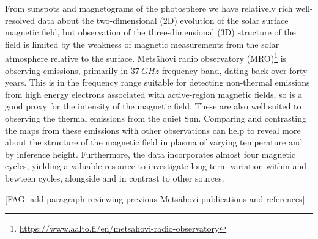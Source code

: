 \documentclass{aa}
\newcommand{\fag}[1]{\textcolor{midpurple}{[FAG: #1]}} %
\begin{document}
  From sunspots and magnetograms of the photosphere we have relatively rich
  well-resolved
  data about the 
  two-dimensional (2D) 
  evolution of the solar surface magnetic 
  field, but observation of the three-dimensional (3D)
  structure of the field is limited by the 
  weakness of magnetic measurements from the solar atmosphere relative to the
  surface.
  Mets\"ahovi radio observatory (MRO)\footnote{
  \href{https://www.aalto.fi/en/metsahovi-radio-observatory}{
        https://www.aalto.fi/en/metsahovi-radio-observatory}}
  is observing emissions, primarily in
  $\SI{37}{GHz}$ frequency band, dating back over forty years.
  This is in the frequency range suitable for detecting non-thermal emissions
  from high energy electrons associated with active-region magnetic fields, so
  is a good proxy for the intensity of the magnetic field.
  These are also well suited to observing the thermal emissions from the quiet
  Sun.
  Comparing and contrasting the maps from these emissions with other
  observations can help to reveal more about the structure of the magnetic
  field in plasma of varying temperature and by inference height.
  Furthermore, the data incorporates almost four magnetic cycles, yielding
  a valuable resource to investigate long-term variation within and bewteen 
  cycles, alongside and in contrast to other sources.

  \fag{add paragraph reviewing previous Mets\"ahovi publications and references}
\end{document}
